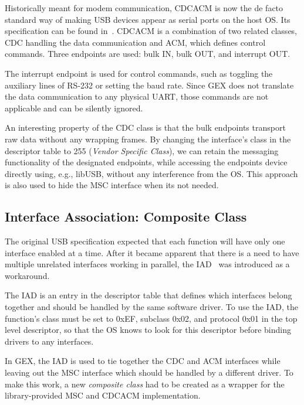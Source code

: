 
Historically meant for modem communication, \gls{CDCACM} is now the de facto standard way of making \gls{USB} devices appear as serial ports on the host \gls{OS}. Its specification can be found in~\cite{usbif-cdc}. \gls{CDCACM} is a combination of two related classes, \gls{CDC} handling the data communication and \gls{ACM}, which defines control commands. Three endpoints are used: bulk IN, bulk OUT, and interrupt OUT.

The interrupt endpoint is used for control commands, such as toggling the auxiliary lines of RS-232 or setting the baud rate. Since GEX does not translate the data communication to any physical UART, those commands are not applicable and can be silently ignored.

An interesting property of the \gls{CDC} class is that the bulk endpoints transport raw data without any wrapping frames. By changing the interface's class in the descriptor table to 255 (\textit{Vendor Specific Class}), we can retain the messaging functionality of the designated endpoints, while accessing the endpoints device directly using, e.g., libUSB, without any interference from the \gls{OS}. This approach is also used to hide the \gls{MSC} interface when its not needed.

\subsection{Interface Association: Composite Class}

The original \gls{USB} specification expected that each function will have only one interface enabled at a time. After it became apparent that there is a need to have multiple unrelated interfaces working in parallel, the \gls{IAD}~\cite{usbif-iad} was introduced as a workaround.

The \gls{IAD} is an entry in the descriptor table that defines which interfaces belong together and should be handled by the same software driver. To use the \gls{IAD}, the function's class must be set to 0xEF, subclass 0x02, and protocol 0x01 in the top level descriptor, so that the \gls{OS} knows to look for this descriptor before binding drivers to any interfaces.

In GEX, the \gls{IAD} is used to tie together the \gls{CDC} and \gls{ACM} interfaces while leaving out the \gls{MSC} interface which should be handled by a different driver. To make this work, a new \textit{composite class} had to be created as a wrapper for the library-provided \gls{MSC} and \gls{CDCACM} implementation.

